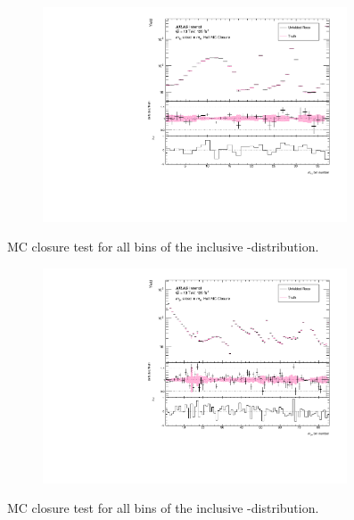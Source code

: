 \begin{figure}[htb]
  \centering
  \begin{subfigure}{.65\textwidth}\centering\includegraphics[width = 0.99\textwidth]{Figures/m4l/UnfoldingStudies/v014_closure/HalfMCClosure_withPull_m12_m4l.pdf}\end{subfigure}
\caption{MC closure test for all bins of the inclusive \mZOne-\mFourL distribution.}
 \end{figure}

\begin{figure}[htb]
  \centering
  \begin{subfigure}{.65\textwidth}\centering\includegraphics[width = 0.99\textwidth]{Figures/m4l/UnfoldingStudies/v014_closure/HalfMCClosure_withPull_m34_m4l.pdf}\end{subfigure}
\caption{MC closure test for all bins of the inclusive \mZTwo-\mFourL distribution.}
 \end{figure}

